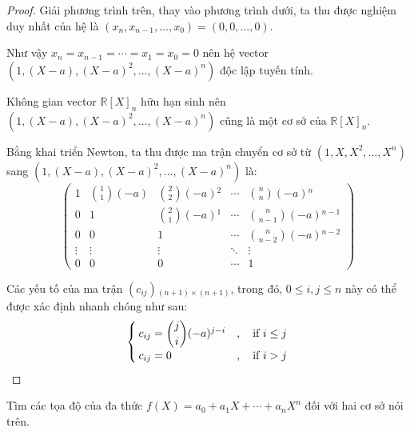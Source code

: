 \begin{proof}
    Giải phương trình trên, thay vào phương trình dưới, ta thu được nghiệm duy nhất của hệ là $(x_{n}, x_{n-1},\ldots, x_{0}) = (0,0,\ldots, 0)$.
    
    Như vậy $x_{n} = x_{n-1} = \cdots = x_{1} = x_{0} = 0$ nên hệ vector $(1, (X - a), {(X-a)}^{2}, \ldots, {(X-a)}^{n})$ độc lập tuyến tính.
    
    Không gian vector ${\mathbb{R}[X]}_{n}$ hữu hạn sinh nên $(1, (X-a), {(X-a)}^{2},\ldots, {(X-a)}^{n})$ cũng là một cơ sở của ${\mathbb{R}[X]}_{n}$.

    \bigskip
    Bằng khai triển Newton, ta thu được ma trận chuyển cơ sở từ $(1, X, X^{2}, \ldots, X^{n})$ sang $(1, (X-a), {(X-a)}^{2}, \ldots, {(X-a)}^{n})$ là:
    \[
        \begin{pmatrix}
            1      & \binom{1}{1}(-a) & \binom{2}{2}(-a){}^{2} & \cdots & \binom{n}{n}(-a){}^{n}     \\
            0      & 1                & \binom{2}{1}(-a){}^{1} & \cdots & \binom{n}{n-1}(-a){}^{n-1} \\
            0      & 0                & 1                      & \cdots & \binom{n}{n-2}(-a){}^{n-2} \\
            \vdots & \vdots           & \vdots                 & \ddots & \vdots                     \\
            0      & 0                & 0                      & \cdots & 1
        \end{pmatrix}
    \]
    
    Các yếu tố của ma trận $(c_{ij}){}_{(n+1)\times(n+1)}$, trong đó, $0\le i, j \le n$ này có thể được xác định nhanh chóng như sau:
    \[
        \begin{cases}
            c_{ij} = \dbinom{j}{i}(-a){}^{j - i} & ,\quad\text{if $i\le j$} \\
            c_{ij} = 0                           & ,\quad\text{if $i > j$}
        \end{cases}
    \]
\end{proof}

\begin{exercise}
    Tìm các tọa độ của đa thức $f(X) = a_{0} + a_{1}X + \cdots + a_{n}X^{n}$ đối với hai cơ sở nói trên.
\end{exercise}

